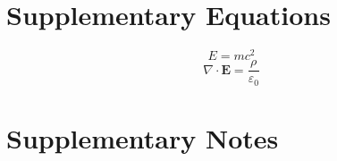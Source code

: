 \documentclass[12pt]{article}
\begin{document}
	\section*{Supplementary Equations}
	\label{sec:supp-equations}
	\begin{equation}
		E = mc^2
	\end{equation}
	\begin{equation}
		\nabla \cdot \mathbf{E} = \frac{\rho}{\varepsilon_0}
	\end{equation}
	
	\section*{Supplementary Notes}
	\label{sec:supp-notes}
	\lipsum[3] %
	
\end{document}
